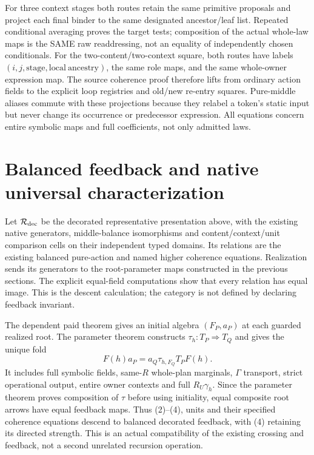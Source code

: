 \documentclass[11pt]{article}
\begin{document}
For three context stages both routes retain the same primitive proposals and project each final binder to the same designated ancestor/leaf list. Repeated conditional averaging proves the target tests; composition of the actual whole-law maps is the SAME raw readdressing, not an equality of independently chosen conditionals. For the two-content/two-context square, both routes have labels $(i,j,\mathrm{stage},\mathrm{local\ ancestry})$, the same role maps, and the same whole-owner expression map. The source coherence proof therefore lifts from ordinary action fields to the explicit loop registries and old/new re-entry squares. Pure-middle aliases commute with these projections because they relabel a token's static input but never change its occurrence or predecessor expression. All equations concern entire symbolic maps and full coefficients, not only admitted laws.

\section{Balanced feedback and native universal characterization}
Let $\mathcal R_{\rm dec}$ be the decorated representative presentation above, with the existing native generators, middle-balance isomorphisms and content/context/unit comparison cells on their independent typed domains. Its relations are the existing balanced pure-action and named higher coherence equations. Realization sends its generators to the root-parameter maps constructed in the previous sections. The explicit equal-field computations show that every relation has equal image. This is the descent calculation; the category is not defined by declaring feedback invariant.

The dependent paid theorem gives an initial algebra $(F_P,a_P)$ at each guarded realized root. The parameter theorem constructs $\tau_h:T_P\Rightarrow T_Q$ and gives the unique fold
\[
          F(h)a_P=a_Q\tau_{h,F_Q}T_PF(h).                \tag{5}
\]
It includes full symbolic fields, same-$R$ whole-plan marginals, $\Gamma$ transport, strict operational output, entire owner contexts and full $R_U\gamma_h$. Since the parameter theorem proves composition of $\tau$ before using initiality, equal composite root arrows have equal feedback maps. Thus (2)--(4), units and their specified coherence equations descend to balanced decorated feedback, with (4) retaining its directed strength. This is an actual compatibility of the existing crossing and feedback, not a second unrelated recursion operation.
\end{document}
